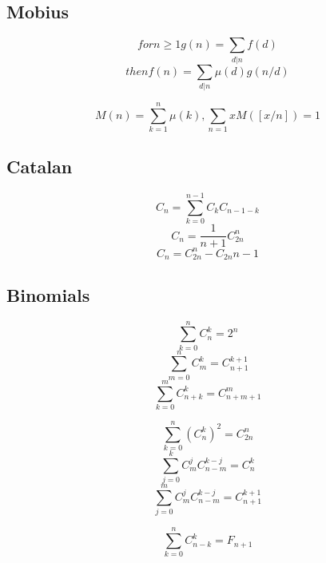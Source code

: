 \subsection{Mobius}
$$for n \ge 1 g(n) = \sum_{d|n}f(d)$$ 
$$then f(n) = \sum_{d|n}\mu(d)g(n/d)$$

$$M(n) = \sum_{k=1}^{n}\mu(k), \sum_{n = 1}{x} M([x/n]) = 1$$

\subsection{Catalan}
$$C_n = \sum_{k = 0}^{n - 1} C_kC_{n - 1 - k}$$ 
$$C_n = \frac{1}{n + 1} C_{2n}^{n}$$
$$C_n = C_{2n}^{n} - C_{2n}{n - 1}$$

\subsection{Binomials}
$$\sum_{k = 0}^{n} C_n^k = 2^n$$ 
$$\sum_{m = 0}^{n} C_m^k = C_{n + 1}^{k + 1}$$
$$\sum_{k = 0}^{m} C_{n + k}^k = C_{n + m + 1}^m$$

$$\sum_{k = 0}^{n} (C_n^k)^2 = C_{2n}^n$$
$$\sum_{j = 0}^{k} C_m^j C_{n-m}^{k - j} = C_n^k$$
$$\sum_{j = 0}^{m} C_m^j C_{n-m}^{k - j} = C_{n + 1}^{k + 1}$$

$$\sum_{k = 0}^{n} C_{n - k}^k = F_{n + 1}$$



